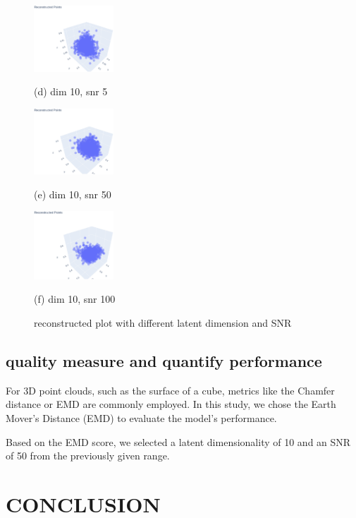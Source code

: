 \documentclass{article}
\begin{document}
\begin{figure}[htb]
  \begin{minipage}[b]{0.3\linewidth}
    \centering
    \includegraphics[width=3.0cm]{images/reconstructed_10_5}
    \centerline{(d) dim 10, snr 5}\medskip
  \end{minipage}
  \hfill
  \begin{minipage}[b]{0.3\linewidth}
    \centering
    \includegraphics[width=3.0cm]{images/reconstructed_10_50}
    \centerline{(e) dim 10, snr 50}\medskip
  \end{minipage}
  \begin{minipage}[b]{0.3\linewidth}
    \centering
    \includegraphics[width=3.0cm]{images/reconstructed_10_100}
    \centerline{(f) dim 10, snr 100}\medskip
  \end{minipage}
  
  \caption{reconstructed plot with different latent dimension and SNR}
  \label{fig:discuss}
\end{figure}

\subsection{quality measure and quantify performance }
\label{ssec:measure}

For 3D point clouds, such as the surface of a cube, metrics like the Chamfer distance or EMD are commonly employed. In this study, we chose the Earth Mover's Distance (EMD) to evaluate the model's performance.

Based on the EMD score, we selected a latent dimensionality of 10 and an SNR of 50 from the previously given range.
\section{CONCLUSION}
\label{sec:conclusion}
\end{document}
